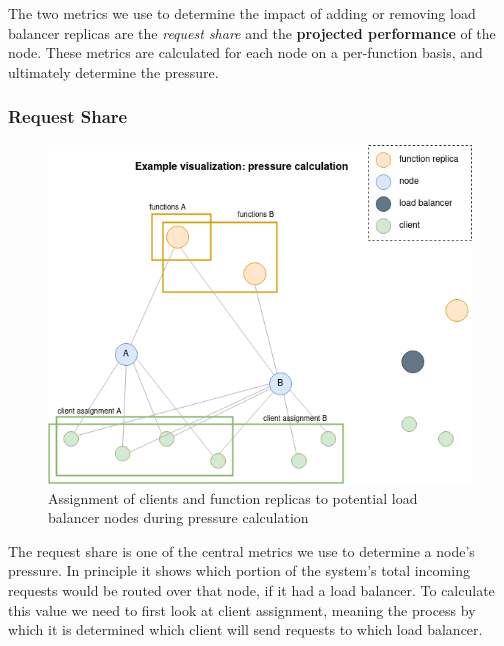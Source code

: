The two metrics we use to determine the impact of adding or removing load balancer replicas are the \textit{request share} and the \textbf{projected performance} of the node.
These metrics are calculated for each node on a per-function basis, and ultimately determine the pressure.

\subsubsection{Request Share}
\begin{figure}
    \centering
    \includegraphics[width=12cm]{graphics/diagrams/client_lb_assignment.png}
    \caption{Assignment of clients and function replicas to potential load balancer nodes during pressure calculation}
    \label{fig:cl_lb_assignment}
\end{figure}
The request share is one of the central metrics we use to determine a node's pressure. In principle it shows which portion of the system's total incoming requests would be routed over that node, if it had a load balancer.
To calculate this value we need to first look at client assignment, meaning the process by which it is determined which client will send requests to which load balancer.

